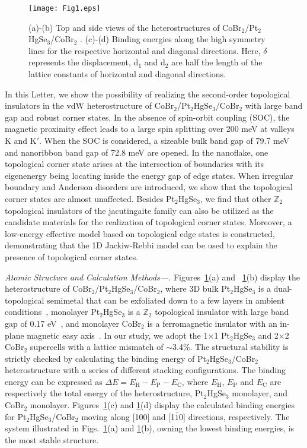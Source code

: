 \documentclass[aps,prl,twocolumn,showpacs,superscriptaddress]{revtex4-1}
\begin{document}
\begin{figure}
  \texttt{[image: Fig1.eps]}
  \caption{(a)-(b) Top and side views of the heterostructures of CoBr$_2$/Pt$_2$HgSe$_3$/CoBr$_2$ . (c)-(d) Binding energies along the high symmetry lines for the respective horizontal and diagonal directions. Here, $\delta$ represents the displacement, d$_1$ and d$_2$ are half the length of the lattice constants of horizontal and diagonal directions.}
  \label{Fig1}
\end{figure}

In this Letter, we show the possibility of realizing the second-order topological insulators in the vdW heterostructure of CoBr$_2$/Pt$_2$HgSe$_3$/CoBr$_2$ with large band gap and robust corner states. In the absence of spin-orbit coupling (SOC), the magnetic proximity effect leads to a large spin splitting over 200 meV at valleys K and K$'$. When the SOC is considered, a sizeable bulk band gap of 79.7 meV and nanoribbon band gap of 72.8 meV are opened. In the nanoflake, one topological corner state arises at the intersection of boundaries with its eigenenergy being locating inside the energy gap of edge states. When irregular boundary and Anderson disorders are introduced, we show that the topological corner states are almost unaffected. Besides Pt$_2$HgSe$_3$, we find that other $\mathbb{Z}_2$ topological insulators of the jacutingaite family can also be utilized as the candidate materials for the realization of topological corner states.
Moreover, a low-energy effective model based on topological edge states is constructed, demonstrating that the 1D Jackiw-Rebbi model can be used to explain the presence of topological corner states.


\textit{Atomic Structure and Calculation Methods---.} Figures~\ref{Fig1}(a) and ~\ref{Fig1}(b) display the heterostructure of CoBr$_2$/Pt$_2$HgSe$_3$/CoBr$_2$, where 3D bulk Pt$_2$HgSe$_3$ is a dual-topological semimetal that can be exfoliated down to a few layers in ambient conditions~\cite{2019_Ghosh,Exp_PHS1,Exp_PHS2}, monolayer Pt$_2$HgSe$_3$ is a $\mathbb{Z}_2$ topological insulator with large band gap of 0.17 eV~\cite{DFT_PHS1,DFT_PHS2}, and monolayer CoBr$_2$ is a ferromagnetic insulator with an in-plane magnetic easy axis~\cite{DFT_CoBr2}. In our study, we adopt the 1$\times$1 Pt$_2$HgSe$_3$ and 2$\times$2 CoBr$_2$ supercells with a lattice mismatch of $\sim$3.4\%. The structural stability is strictly checked by calculating the binding energy of Pt$_2$HgSe$_3$/CoBr$_2$ heterostructure with a series of different stacking configurations. The binding energy can be expressed as $\Delta E=E_{\text{H}}-E_{\text{P}}-E_{\text{C}}$, where $E_{\text{H}}$, $E_{\text{P}}$ and $E_{\text{C}}$ are respectively the total energy of the heterostructure, Pt$_2$HgSe$_3$ monolayer, and CoBr$_2$ monolayer. Figures~\ref{Fig1}(c) and \ref{Fig1}(d) display the calculated binding energies for Pt$_2$HgSe$_3$/CoBr$_2$ moving along [100] and [1$\overline{1}$0] directions, respectively. The system illustrated in Figs.~\ref{Fig1}(a) and \ref{Fig1}(b), owning the lowest binding energies, is the most stable structure.
\end{document}
